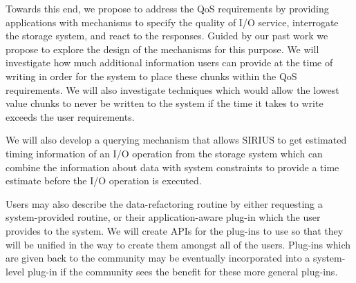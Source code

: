 Towards this end, we propose to
address the QoS requirements by providing applications with mechanisms to
specify the quality of I/O service, interrogate the storage system, and react
to the responses. Guided by our past work we propose to explore the design of
the mechanisms for this purpose.  %
We will investigate how much additional information users
can provide at the time of writing in order for the system to place these chunks within
the QoS requirements. We will also investigate techniques which would allow the lowest
value chunks to never be written to the system if the time it takes to write exceeds the user
requirements.

We will also develop a querying mechanism that allows SIRIUS
to get estimated timing information of an I/O operation from the storage
system which can combine the information about data with system constraints
to provide a time estimate before the I/O operation is executed. 



Users may also describe the data-refactoring routine by either requesting a system-provided
routine, or their application-aware plug-in which the user provides to the system. We will
create APIs for the plug-ins to use so that they will be unified in the way to create them
amongst all of the users. Plug-ins which are given back to the community may be 
eventually incorporated into a system-level plug-in if the community sees the benefit for
these more general plug-ins.


